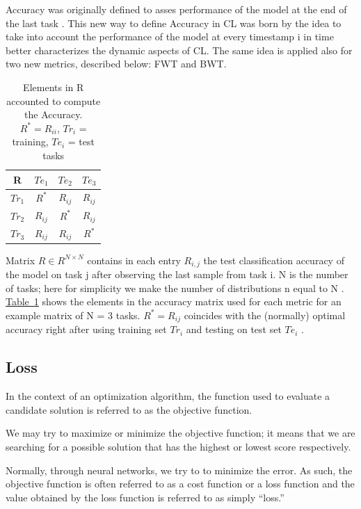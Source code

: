 \documentclass[english, LaM, oneside]{sapthesis}%
\begin{document}
Accuracy was originally defined to asses performance of the model at the end of the last task \cite{lopez}. This new way to define Accuracy in CL was born by the idea to take into account the performance of the model at every timestamp i in time better characterizes the dynamic aspects of CL. The same idea is applied also for two new metrics, described below: FWT and BWT.

\begin{table}[h!]
            \centering
            \begin{tabular}{ |c| c c c| }
                \hline
               R & $Te_1$ & $Te_2$ & $Te_3$ \\
                \hline \hline
                 $Tr_1$ & $R^\ast$ & $R_{ij}$ & $R_{ij}$ \\
                \hline
                 $Tr_2$ & $R_{ij}$ & $R^\ast$ & $R_{ij}$ \\
                \hline
                 $Tr_3$ & $R_{ij}$ & $R_{ij}$ & $R^\ast$ \\
                \hline 
            \end{tabular}
            \caption{Elements in R accounted to compute the Accuracy.
            $R^\ast = R_{ii}$, $Tr_i$ = training, $Te_i$ = test tasks}
            \label{tab:acc}
        \end{table}
        
Matrix $R \in R ^{N×N}$ contains in each entry $R_{i,j}$ the test classification accuracy of the model on task j after observing the last sample from task i. N is the number of tasks; here for simplicity we make the number of distributions n equal to N . \hyperref[tab:acc]{Table~\ref*{tab:acc}} shows the elements in the accuracy matrix used for each metric for an example matrix of N = 3 tasks. $R^\ast = R_{ij}$ coincides with the (normally) optimal accuracy right after using training set $Tr_i$ and testing on test set $Te_i$ .
\subsection{Loss}
In the context of an optimization algorithm, the function used to evaluate a candidate solution is referred to as the objective function.

We may try to maximize or minimize the objective function; it means that we are searching for a possible solution that has the highest or lowest score respectively.

Normally, through neural networks, we try to to minimize the error. As such, the objective function is often referred to as a cost function or a loss function and the value obtained by the loss function is referred to as simply “loss.”
\end{document}
